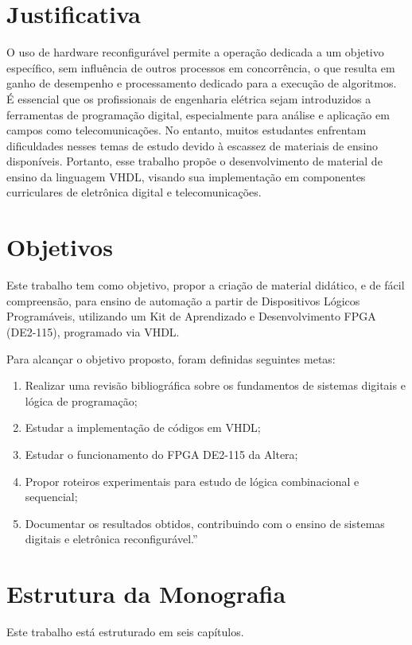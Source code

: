\section {Justificativa}

O uso de hardware reconfigurável permite a operação dedicada a um objetivo específico, sem influência de outros processos em concorrência, o que resulta em ganho de desempenho e processamento dedicado para a execução de algoritmos. É essencial que os profissionais de engenharia elétrica sejam introduzidos a ferramentas de programação digital, especialmente para análise e aplicação em campos como telecomunicações. No entanto, muitos estudantes enfrentam dificuldades nesses temas de estudo devido à escassez de materiais de ensino disponíveis. Portanto, esse trabalho propõe o desenvolvimento de material de ensino da linguagem VHDL, visando sua implementação em componentes curriculares de eletrônica digital e telecomunicações. 
 

\section{Objetivos}

Este trabalho tem como objetivo, propor a criação de material didático, e de fácil compreensão, para ensino de automação a partir de Dispositivos Lógicos Programáveis, utilizando um Kit de Aprendizado e Desenvolvimento FPGA (DE2-115), programado via VHDL.

Para alcançar o objetivo proposto, foram definidas seguintes metas:

\begin{enumerate}[label={\noNalph{enumi})}]
    \item Realizar uma revisão bibliográfica sobre os fundamentos de sistemas digitais e lógica de programação;
    \item Estudar a implementação de códigos em VHDL;
    \item Estudar o funcionamento do FPGA DE2-115 da Altera;
    \item Propor roteiros experimentais para estudo de lógica combinacional e sequencial;
    \item Documentar os resultados obtidos, contribuindo com o ensino de sistemas digitais e eletrônica reconfigurável.”
\end{enumerate}

\section{Estrutura da Monografia}
Este trabalho está estruturado em seis capítulos.

